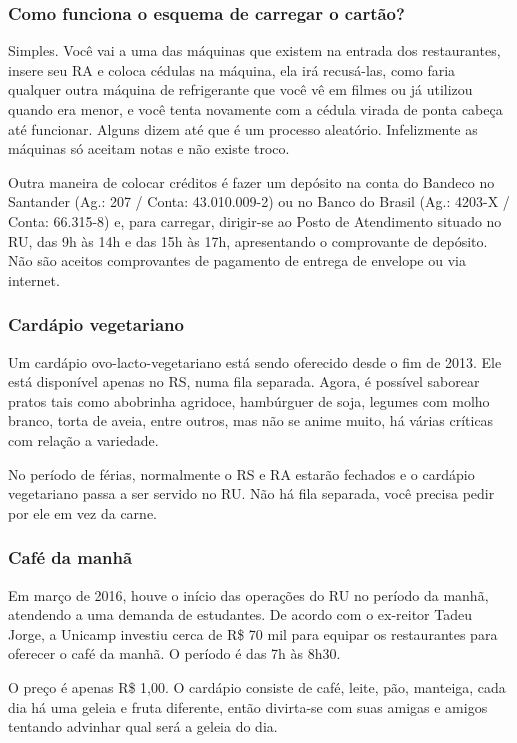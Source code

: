 \subsubsection{Como funciona o esquema de carregar o cartão?}

Simples. Você vai a uma das máquinas que existem na entrada dos restaurantes,
insere seu RA e coloca cédulas na máquina, ela irá recusá-las, como faria
qualquer outra máquina de refrigerante que você vê em filmes ou já utilizou
quando era menor, e você tenta novamente com a cédula virada de ponta cabeça
até funcionar. Alguns dizem até que é um processo aleatório. Infelizmente as
máquinas só aceitam notas e não existe troco.

Outra maneira de colocar créditos é fazer um depósito na conta do Bandeco no
Santander (Ag.: 207 / Conta: 43.010.009-2) ou no Banco do Brasil (Ag.: 4203-X /
Conta: 66.315-8) e, para carregar, dirigir-se ao Posto de Atendimento situado
no RU, das 9h às 14h e das 15h às 17h, apresentando o comprovante de depósito.
Não são aceitos comprovantes de pagamento de entrega de envelope ou via
internet.

\subsubsection{Cardápio vegetariano}

Um cardápio ovo-lacto-vegetariano está sendo oferecido desde o fim de 2013. Ele
está disponível apenas no RS, numa fila separada. Agora, é possível saborear
pratos tais como abobrinha agridoce, hambúrguer de soja, legumes com molho
branco, torta de aveia, entre outros, mas não se anime muito, há várias
críticas com relação a variedade.

No período de férias, normalmente o RS e RA estarão fechados e o cardápio
vegetariano passa a ser servido no RU. Não há fila separada, você precisa pedir
por ele em vez da carne.

\subsubsection{Café da manhã}

Em março de 2016, houve o início das operações do RU no período da manhã,
atendendo a uma demanda de estudantes. De acordo com o ex-reitor Tadeu Jorge,
a Unicamp investiu cerca de R\$ 70 mil para equipar os restaurantes para
oferecer o café da manhã. O período é das 7h às 8h30.

O preço é apenas R\$ 1,00. O cardápio consiste de café, leite, pão, manteiga,
cada dia há uma geleia e fruta diferente, então divirta-se com suas amigas e
amigos tentando advinhar qual será a geleia do dia.

